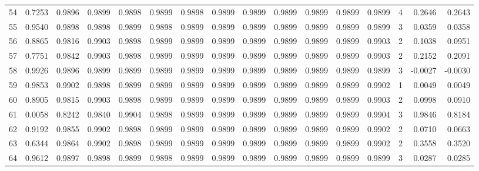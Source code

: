 \begin{tabular}{lrrrrrrrrrrrrrrr}
54  &      0.7253 &  0.9896 &  0.9899 &  0.9898 &  0.9899 &  0.9898 &  0.9899 &  0.9899 &  0.9899 &  0.9899 &   0.9899 &     0.9899 &      4 &                    0.2646 &                     0.2643 \\
55  &      0.9540 &  0.9898 &  0.9898 &  0.9899 &  0.9898 &  0.9899 &  0.9899 &  0.9899 &  0.9899 &  0.9899 &   0.9899 &     0.9899 &      3 &                    0.0359 &                     0.0358 \\
56  &      0.8865 &  0.9816 &  0.9903 &  0.9898 &  0.9899 &  0.9899 &  0.9899 &  0.9899 &  0.9899 &  0.9899 &   0.9899 &     0.9903 &      2 &                    0.1038 &                     0.0951 \\
57  &      0.7751 &  0.9842 &  0.9903 &  0.9898 &  0.9899 &  0.9899 &  0.9899 &  0.9899 &  0.9899 &  0.9899 &   0.9899 &     0.9903 &      2 &                    0.2152 &                     0.2091 \\
58  &      0.9926 &  0.9896 &  0.9899 &  0.9899 &  0.9899 &  0.9899 &  0.9899 &  0.9899 &  0.9899 &  0.9899 &   0.9899 &     0.9899 &      3 &                   -0.0027 &                    -0.0030 \\
59  &      0.9853 &  0.9902 &  0.9898 &  0.9899 &  0.9899 &  0.9899 &  0.9899 &  0.9899 &  0.9899 &  0.9899 &   0.9899 &     0.9902 &      1 &                    0.0049 &                     0.0049 \\
60  &      0.8905 &  0.9815 &  0.9903 &  0.9898 &  0.9899 &  0.9899 &  0.9899 &  0.9899 &  0.9899 &  0.9899 &   0.9899 &     0.9903 &      2 &                    0.0998 &                     0.0910 \\
61  &      0.0058 &  0.8242 &  0.9840 &  0.9904 &  0.9898 &  0.9899 &  0.9899 &  0.9899 &  0.9899 &  0.9899 &   0.9899 &     0.9904 &      3 &                    0.9846 &                     0.8184 \\
62  &      0.9192 &  0.9855 &  0.9902 &  0.9898 &  0.9899 &  0.9899 &  0.9899 &  0.9899 &  0.9899 &  0.9899 &   0.9899 &     0.9902 &      2 &                    0.0710 &                     0.0663 \\
63  &      0.6344 &  0.9864 &  0.9902 &  0.9898 &  0.9899 &  0.9899 &  0.9899 &  0.9899 &  0.9899 &  0.9899 &   0.9899 &     0.9902 &      2 &                    0.3558 &                     0.3520 \\
64  &      0.9612 &  0.9897 &  0.9898 &  0.9899 &  0.9898 &  0.9899 &  0.9899 &  0.9899 &  0.9899 &  0.9899 &   0.9899 &     0.9899 &      3 &                    0.0287 &                     0.0285 \\

\end{tabular}
